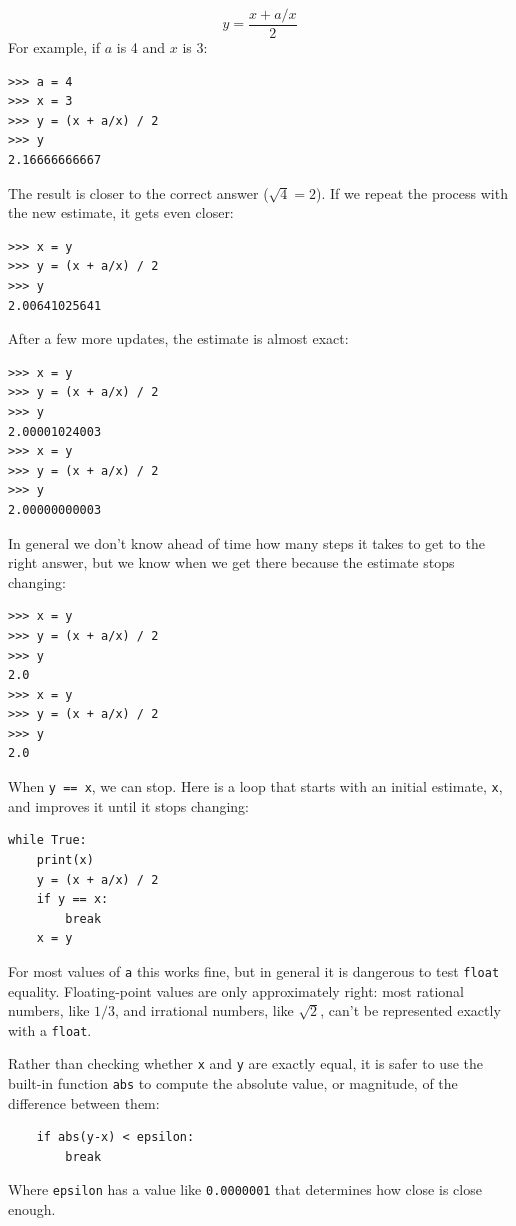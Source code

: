 \documentclass[10pt]{book}
\begin{document}
\[ y = \frac{x + a/x}{2} \]
%
For example, if $a$ is 4 and $x$ is 3:

\begin{verbatim}
>>> a = 4
>>> x = 3
>>> y = (x + a/x) / 2
>>> y
2.16666666667
\end{verbatim}
%
The result is closer to the correct answer ($\sqrt{4} = 2$).  If we
repeat the process with the new estimate, it gets even closer:

\begin{verbatim}
>>> x = y
>>> y = (x + a/x) / 2
>>> y
2.00641025641
\end{verbatim}
%
After a few more updates, the estimate is almost exact:

\begin{verbatim}
>>> x = y
>>> y = (x + a/x) / 2
>>> y
2.00001024003
>>> x = y
>>> y = (x + a/x) / 2
>>> y
2.00000000003
\end{verbatim}
%
In general we don't know ahead of time how many steps it takes
to get to the right answer, but we know when we get there
because the estimate
stops changing:

\begin{verbatim}
>>> x = y
>>> y = (x + a/x) / 2
>>> y
2.0
>>> x = y
>>> y = (x + a/x) / 2
>>> y
2.0
\end{verbatim}
%
When {\tt y == x}, we can stop.  Here is a loop that starts
with an initial estimate, {\tt x}, and improves it until it
stops changing:

\begin{verbatim}
while True:
    print(x)
    y = (x + a/x) / 2
    if y == x:
        break
    x = y
\end{verbatim}
%
For most values of {\tt a} this works fine, but in general it is
dangerous to test {\tt float} equality.
Floating-point values are only approximately right:
most rational numbers, like $1/3$, and irrational numbers, like
$\sqrt{2}$, can't be represented exactly with a {\tt float}.

Rather than checking whether {\tt x} and {\tt y} are exactly equal, it
is safer to use the built-in function {\tt abs} to compute the
absolute value, or magnitude, of the difference between them:

\begin{verbatim}
    if abs(y-x) < epsilon:
        break
\end{verbatim}
%
Where \verb"epsilon" has a value like {\tt 0.0000001} that
determines how close is close enough.
\end{document}
